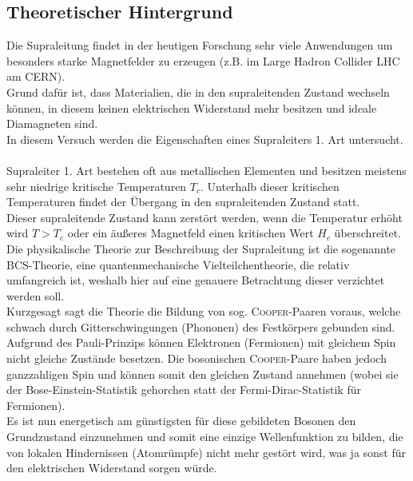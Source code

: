 \documentclass[german,  %
parskip=full,  %
headsepline]{scrartcl}
\begin{document}
\subsection{Theoretischer Hintergrund}
Die Supraleitung findet in der heutigen Forschung sehr viele Anwendungen um besonders starke Magnetfelder zu erzeugen (z.B. im Large Hadron Collider LHC am CERN).\\
Grund dafür ist, dass Materialien, die in den supraleitenden Zustand wechseln können, in diesem keinen elektrischen Widerstand mehr besitzen und ideale Diamagneten sind.\\
In diesem Versuch werden die Eigenschaften eines Supraleiters 1. Art untersucht. \\
\\Supraleiter 1. Art bestehen oft aus metallischen Elementen und besitzen meistens sehr niedrige kritische Temperaturen $T_c$. Unterhalb dieser kritischen Temperaturen findet der Übergang in den supraleitenden Zustand statt.\\
Dieser supraleitende Zustand kann zerstört werden, wenn die Temperatur erhöht wird $T > T_c$ oder ein äußeres Magnetfeld einen kritischen Wert $H_c$ überschreitet.\\
Die physikalische Theorie zur Beschreibung der Supraleitung ist die sogenannte \textsc{BCS}-Theorie, eine quantenmechanische Vielteilchentheorie, die relativ umfangreich ist, weshalb hier auf eine genauere Betrachtung dieser verzichtet werden soll.\\
Kurzgesagt sagt die Theorie die Bildung von sog. \textsc{Cooper}-Paaren voraus, welche schwach durch Gitterschwingungen (Phononen) des Festkörpers gebunden sind. Aufgrund des Pauli-Prinzips können Elektronen (Fermionen) mit gleichem Spin nicht gleiche Zustände besetzen. Die bosonischen \textsc{Cooper}-Paare haben jedoch ganzzahligen Spin und können somit den gleichen Zustand annehmen (wobei sie der Bose-Einstein-Statistik gehorchen statt der Fermi-Dirac-Statistik für Fermionen).\cite[122-125]{Buckel} \\
Es ist nun energetisch am günstigsten für diese gebildeten Bosonen den Grundzustand einzunehmen und somit eine einzige Wellenfunktion zu bilden, die von lokalen Hindernissen (Atomrümpfe) nicht mehr gestört wird, was ja sonst für den elektrischen Widerstand sorgen würde.\\
\end{document}
